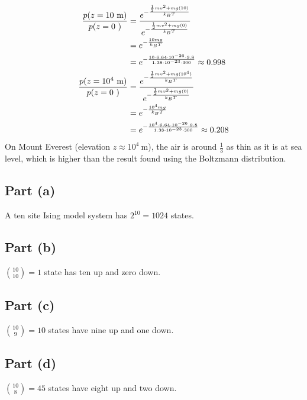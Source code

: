 \documentclass{article}
\begin{document}
\begin{equation}
    \begin{split}
        \frac{p(z = 10~\unit{\meter})}{p(z = 0~\unit)} & = \frac{e^{-\frac{\frac{1}{2}mv^2 + mg(10)}{k_B T}}}{e^{-\frac{\frac{1}{2}mv^2 + mg(0)}{k_B T}}} \\
        & = e^{-\frac{10mg}{k_B T}} \\
        & = e^{-\frac{10 \cdot 6.64 \cdot 10^{-26} \cdot 9.8}{1.38 \cdot 10^{-23} \cdot 300}} \approx 0.998 \\
        \frac{p(z = 10^4~\unit{\meter})}{p(z = 0~\unit)} & = \frac{e^{-\frac{\frac{1}{2}mv^2 + mg(10^4)}{k_B T}}}{e^{-\frac{\frac{1}{2}mv^2 + mg(0)}{k_B T}}} \\
        & = e^{-\frac{10^4mg}{k_B T}} \\
        & = e^{-\frac{10^4 \cdot 6.64 \cdot 10^{-26} \cdot 9.8}{1.38 \cdot 10^{-23} \cdot 300}} \approx 0.208 \\
    \end{split}
\end{equation}
On Mount Everest (elevation $z \approx 10^4~\unit{\meter}$), the air is around $\frac{1}{3}$ as thin as it is at sea level, which is higher than the result found using the Boltzmann distribution.

\clearpage

\problem
\subsection*{Part (a)}
A ten site Ising model system has $2^{10} = 1024$ states.
\subsection*{Part (b)}
${10 \choose 10} = 1$ state has ten up and zero down.
\subsection*{Part (c)}
${10 \choose 9} = 10$ states have nine up and one down.
\subsection*{Part (d)}
${10 \choose 8} = 45$ states have eight up and two down.
\end{document}
